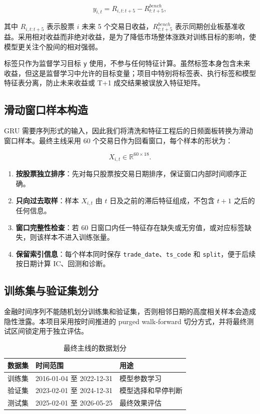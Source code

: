 \documentclass[12pt,a4paper,cn,bibtex]{elegantpaper}
\begin{document}
\[
    y_{i,t} = R_{i,t:t+5} - R^{bench}_{t:t+5},
\]

其中 $R_{i,t:t+5}$ 表示股票 $i$ 未来 5 个交易日收益，$R^{bench}_{t:t+5}$ 表示同期创业板基准收益。采用相对收益而非绝对收益，是为了降低市场整体涨跌对训练目标的影响，使模型更关注个股间的相对强弱。

标签只作为监督学习目标 \texttt{y} 使用，不参与任何特征计算。虽然标签本身包含未来收益，但这是监督学习中允许的目标变量；项目中特别将标签表、执行标签和模型特征表分离，防止未来收益或 T+1 成交结果被误放入特征矩阵。

\subsection{滑动窗口样本构造}

GRU 需要序列形式的输入，因此我们将清洗和特征工程后的日频面板转换为滑动窗口样本。最终主线采用 60 个交易日作为回看窗口，每个样本的形状为：

\[
    X_{i,t} \in \mathbb{R}^{60 \times 18}.
\]

\begin{enumerate}
    \item \textbf{按股票独立排序}：先对每只股票按交易日期排序，保证窗口内部时间顺序正确。
    \item \textbf{只向过去取样}：样本 $X_{i,t}$ 由 $t$ 日及之前的滞后特征组成，不包含 $t+1$ 之后的任何信息。
    \item \textbf{窗口完整性检查}：若 60 日窗口内任一特征存在缺失或无穷值，或对应标签缺失，则该样本不进入训练张量。
    \item \textbf{保留索引信息}：每个样本同时保存 \texttt{trade\_date}、\texttt{ts\_code} 和 \texttt{split}，便于后续按日期计算 IC、回测和诊断。
\end{enumerate}

\subsection{训练集与验证集划分}

金融时间序列不能随机划分训练集和验证集，否则相邻日期的高度相关样本会造成隐性泄露。本项目采用按时间推进的 purged walk-forward 切分方式，并将最终测试区间锁定用于独立评估。

\begin{table}[H]
    \centering
    \caption{最终主线的数据划分}
    \begin{tabular}{lll}
        \toprule
        数据集 & 时间范围 & 用途 \\
        \midrule
        训练集 & 2016-01-04 至 2022-12-31 & 模型参数学习 \\
        验证集 & 2023-02-01 至 2024-12-31 & 模型选择和早停判断 \\
        测试集 & 2025-02-01 至 2026-05-25 & 最终效果评估 \\
        \bottomrule
    \end{tabular}
\end{table}
\end{document}
